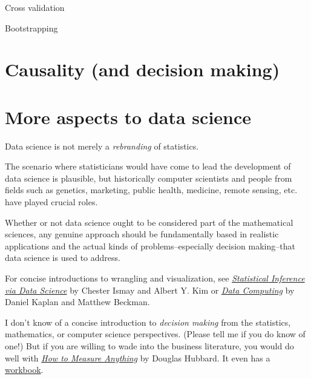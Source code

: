 \documentclass[]{book}
\begin{document}
Cross validation

Bootstrapping

\hypertarget{causality-and-decision-making}{%
\chapter{Causality (and decision making)}\label{causality-and-decision-making}}

\hypertarget{more-aspects-to-data-science}{%
\chapter{More aspects to data science}\label{more-aspects-to-data-science}}

Data science is not merely a \emph{rebranding} of statistics.

The scenario where statisticians would have come to lead the development of data science is plausible, but historically computer scientists and people from fields such as genetics, marketing, public health, medicine, remote sensing, etc. have played crucial roles.

Whether or not data science ought to be considered part of the mathematical sciences, any genuine approach should be fundamentally based in realistic applications and the actual kinds of problems--especially decision making--that data science is used to address.

For concise introductions to wrangling and visualization, see \emph{\href{http://moderndive.com/}{Statistical Inference via Data Science}} by Chester Ismay and Albert Y. Kim or \emph{\href{https://dtkaplan.github.io/DataComputingEbook/}{Data Computing}} by Daniel Kaplan and Matthew Beckman.

I don't know of a concise introduction to \emph{decision making} from the statistics, mathematics, or computer science perspectives. (Please tell me if you do know of one!) But if you are willing to wade into the business literature, you would do well with \emph{\href{https://www.amazon.com/How-Measure-Anything-Intangibles-Business-ebook/dp/B00INUYS2U/ref=pd_sim_351_1/130-1891063-4524949?_encoding=UTF8\&pd_rd_i=B00INUYS2U\&pd_rd_r=32024490-cad3-4711-b83a-f50cd25fc381\&pd_rd_w=sZwy1\&pd_rd_wg=z8fga\&pf_rd_p=04d27813-a1f2-4e7b-a32b-b5ab374ce3f9\&pf_rd_r=JBWKKZ2FBZT91HD87EZD\&psc=1\&refRID=JBWKKZ2FBZT91HD87EZD}{How to Measure Anything}} by Douglas Hubbard. It even has a \href{https://www.amazon.com/How-Measure-Anything-Workbook-Intangibles-ebook/dp/B00IPG7CH0/ref=pd_sim_351_1/130-1891063-4524949?_encoding=UTF8\&pd_rd_i=B00IPG7CH0\&pd_rd_r=3ba15b27-45a9-4c39-bf5c-7155fcf0bca2\&pd_rd_w=npc9z\&pd_rd_wg=JdiFD\&pf_rd_p=04d27813-a1f2-4e7b-a32b-b5ab374ce3f9\&pf_rd_r=3ARMRY192FZ343N2J0DB\&psc=1\&refRID=3ARMRY192FZ343N2J0DB}{workbook}.
\end{document}
